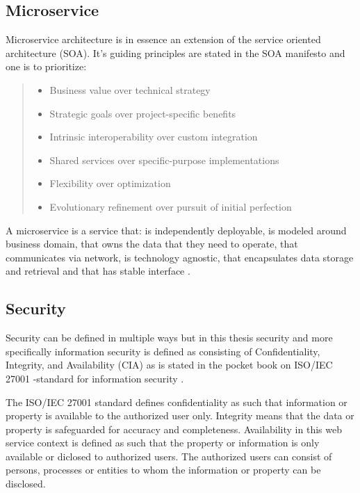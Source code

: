 \subsection{Microservice}
\begin{sloppypar}

    Microservice architecture is in essence an extension of the
    service oriented architecture (SOA). It's guiding principles are stated in the 
    SOA manifesto \citep{soamanifesto} and one is to prioritize:
    \begin{quotation}
        \noindent \it
        \begin{itemize}
            \item Business value over technical strategy
            \item Strategic goals over project-specific benefits 
            \item Intrinsic interoperability over custom integration 
            \item Shared services over specific-purpose implementations 
            \item Flexibility over optimization 
            \item Evolutionary refinement over pursuit of initial perfection
        \end{itemize}
    \end{quotation}

    A microservice is a service that: is independently deployable,
    is modeled around business domain,
    that owns the data that they need to operate,
    that communicates via network,
    is technology agnostic,
    that encapsulates data storage and retrieval and 
    that has stable interface \citep{newman2019}.

    \subsection{Security}

    Security can be defined in multiple ways but in this thesis security 
    and more specifically information security is defined as consisting of 
    Confidentiality, Integrity, and Availability (CIA) as is stated in the 
    pocket book on ISO/IEC 27001 -standard for information security \citep{isoiec27001}.

    The ISO/IEC 27001 standard defines confidentiality as such that information or property 
    is available to the authorized user only.
    Integrity means that the data or property is safeguarded for accuracy and completeness.
    Availability in this web service context is defined as such that the property or information 
    is only available or diclosed to authorized users.
    The authorized users can consist of persons, processes or entities to whom 
    the information or property can be disclosed.
\end{sloppypar}

